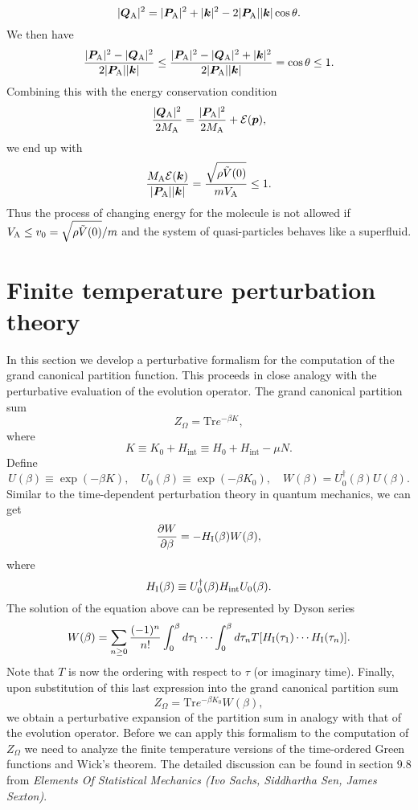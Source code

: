 \[|\bm{Q}_{\rm A}|^2 = |\bm{P}_{\rm A}|^2 + |\bm{k}|^2 - 2|\bm{P}_{\rm A}||\bm{k}|\cos\theta.\]
We then have
\[\frac{|\bm{P}_{\rm A}|^2-|\bm{Q}_{\rm A}|^2}{2|\bm{P}_{\rm A}| |\bm{k}|} \leq \frac{|\bm{P}_{\rm A}|^2-|\bm{Q}_{\rm A}|^2 + |\bm{k}|^2}{2|\bm{P}_{\rm A}| |\bm{k}|} = \cos\theta \leq 1.\]
Combining this with the energy conservation condition
\[\frac{|\bm{Q}_{\rm A}|^2}{2M_{\rm A}} = \frac{|\bm{P}_{\rm A}|^2}{2M_{\rm A}} + \mathcal{E}(\bm{p}),\]
we end up with
\[\frac{M_{\rm A}\mathcal{E}(\bm{k})}{|\bm{P}_{\rm A}| |\bm{k}|} = \frac{\sqrt{\rho \tilde{V}(0)}}{mV_{\rm A}} \leq 1.\]
Thus the process of changing energy for the molecule is not allowed if $V_{\rm A} \leq v_0 = \sqrt{\rho \tilde{V}(0)} / m $ and the system of quasi-particles behaves like a superfluid.

\section{Finite temperature perturbation theory}
In this section we develop a perturbative formalism for the computation of the grand canonical partition function. This proceeds in close analogy with the perturbative evaluation of the evolution operator. The grand canonical partition sum 
\[Z_{\Omega} = \mathrm{Tr}e^{-\beta K},\]
where
\[K \equiv K_0 + H_{\mathrm{int}} \equiv H_0 + H_{\mathrm{int}} -\mu N.\]
Define
\[U(\beta) \equiv \exp(-\beta K) , \quad U_0(\beta) \equiv \exp(-\beta K_0) , \quad W(\beta) = U_0^{\dagger}(\beta)U(\beta).\]
Similar to the time-dependent perturbation theory in quantum mechanics, we can get
\[\frac{\partial W}{\partial \beta} = -H_{\rm I}(\beta)W(\beta),\]
where
\[H_{\rm I}(\beta) \equiv U_0^{\dagger}(\beta)H_{\mathrm{int}}U_0(\beta).\]
The solution of the equation above can be represented by Dyson series
\[W(\beta) = \sum_{n \geq 0} \frac{(-1)^n}{n!} \int_0^{\beta}d\tau_1 \cdots \int_0^{\beta} d\tau_n T[H_{\rm I}(\tau_1)\cdots H_{\rm I}(\tau_n)].\]
Note that $T$ is now the ordering with respect to $\tau$ (or imaginary time). Finally, upon substitution of this last expression into the grand canonical partition sum
\[Z_{\Omega} = \mathrm{Tr} e^{-\beta K_0}W(\beta),\]
we obtain a perturbative expansion of the partition sum in analogy with that of the evolution operator. Before we can apply this formalism to the computation of $Z_{\Omega}$ we need to analyze the finite temperature versions of the time-ordered Green functions and Wick's theorem. The detailed discussion can be found in section 9.8 from \emph{Elements Of Statistical Mechanics (Ivo Sachs, Siddhartha Sen, James Sexton)}.

